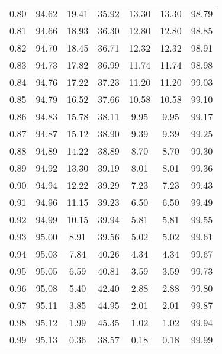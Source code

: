 \begin{tabular}{|c|c|c|c|c|c|c|}
      0.80 &     94.62 &     19.41 &      35.92 &   13.30 &      13.30 &         98.79 \\
      0.81 &     94.66 &     18.93 &      36.30 &   12.80 &      12.80 &         98.85 \\
      0.82 &     94.70 &     18.45 &      36.71 &   12.32 &      12.32 &         98.91 \\
      0.83 &     94.73 &     17.82 &      36.99 &   11.74 &      11.74 &         98.98 \\
      0.84 &     94.76 &     17.22 &      37.23 &   11.20 &      11.20 &         99.03 \\
      0.85 &     94.79 &     16.52 &      37.66 &   10.58 &      10.58 &         99.10 \\
      0.86 &     94.83 &     15.78 &      38.11 &    9.95 &       9.95 &         99.17 \\
      0.87 &     94.87 &     15.12 &      38.90 &    9.39 &       9.39 &         99.25 \\
      0.88 &     94.89 &     14.22 &      38.89 &    8.70 &       8.70 &         99.30 \\
      0.89 &     94.92 &     13.30 &      39.19 &    8.01 &       8.01 &         99.36 \\
      0.90 &     94.94 &     12.22 &      39.29 &    7.23 &       7.23 &         99.43 \\
      0.91 &     94.96 &     11.15 &      39.23 &    6.50 &       6.50 &         99.49 \\
      0.92 &     94.99 &     10.15 &      39.94 &    5.81 &       5.81 &         99.55 \\
      0.93 &     95.00 &      8.91 &      39.56 &    5.02 &       5.02 &         99.61 \\
      0.94 &     95.03 &      7.84 &      40.26 &    4.34 &       4.34 &         99.67 \\
      0.95 &     95.05 &      6.59 &      40.81 &    3.59 &       3.59 &         99.73 \\
      0.96 &     95.08 &      5.40 &      42.40 &    2.88 &       2.88 &         99.80 \\
      0.97 &     95.11 &      3.85 &      44.95 &    2.01 &       2.01 &         99.87 \\
      0.98 &     95.12 &      1.99 &      45.35 &    1.02 &       1.02 &         99.94 \\
      0.99 &     95.13 &      0.36 &      38.57 &    0.18 &       0.18 &         99.99 \\
\bottomrule
\end{tabular}

